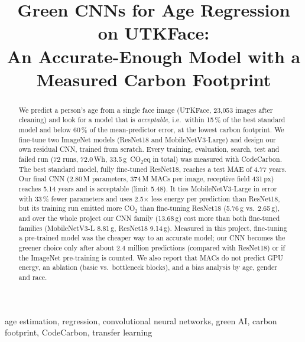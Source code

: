 \documentclass[conference,a4paper]{IEEEtran}
\newcommand{\cotwo}{CO$_2$}
\newcommand{\cotwoeq}{CO$_2$eq}
\begin{document}
\title{Green CNNs for Age Regression on UTKFace:\\ An Accurate-Enough Model with a Measured Carbon Footprint}

\author{
}

\maketitle

\begin{abstract}
We predict a person's age from a single face image (UTKFace, 23{,}053 images after cleaning) and look for a model that is \emph{acceptable}, i.e.\ within 15\,\% of the best standard model and below 60\,\% of the mean-predictor error, at the lowest carbon footprint. We fine-tune two ImageNet models (ResNet18 and MobileNetV3-Large) and design our own residual CNN, trained from scratch. Every training, evaluation, search, test and failed run (72 runs, 72.0\,Wh, 33.5\,g~\cotwoeq{} in total) was measured with CodeCarbon. The best standard model, fully fine-tuned ResNet18, reaches a test MAE of 4.77 years. Our final CNN (2.80\,M parameters, 374\,M MACs per image, receptive field 431\,px) reaches 5.14 years and is acceptable (limit 5.48). It ties MobileNetV3-Large in error with 33\,\% fewer parameters and uses 2.5$\times$ less energy per prediction than ResNet18, but its training run emitted more \cotwo{} than fine-tuning ResNet18 (5.76\,g vs.\ 2.65\,g), and over the whole project our CNN family (13.68\,g) cost more than both fine-tuned families (MobileNetV3-L 8.81\,g, ResNet18 9.14\,g). Measured in this project, fine-tuning a pre-trained model was the cheaper way to an accurate model; our CNN becomes the greener choice only after about 2.4 million predictions (compared with ResNet18) or if the ImageNet pre-training is counted. We also report that MACs do not predict GPU energy, an ablation (basic vs.\ bottleneck blocks), and a bias analysis by age, gender and race.
\end{abstract}

\begin{IEEEkeywords}
age estimation, regression, convolutional neural networks, green AI, carbon footprint, CodeCarbon, transfer learning
\end{IEEEkeywords}
\end{document}
